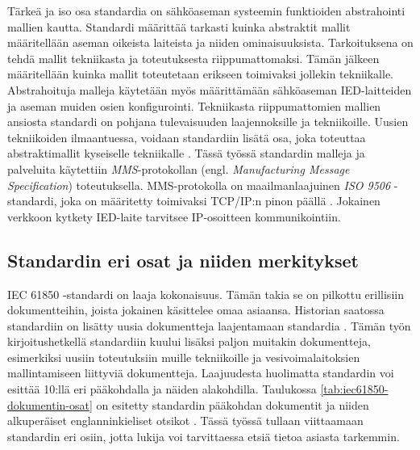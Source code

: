 Tärkeä ja iso osa standardia on sähköaseman systeemin funktioiden abstrahointi mallien kautta. Standardi määrittää tarkasti kuinka abstraktit mallit määritellään aseman oikeista laiteista ja niiden ominaisuuksista. Tarkoituksena on tehdä mallit tekniikasta ja toteutuksesta riippumattomaksi. Tämän jälkeen määritellään kuinka mallit toteutetaan erikseen toimivaksi jollekin tekniikalle. Abstrahoituja malleja käytetään myös määrittämään sähköaseman IED-laitteiden ja aseman muiden osien konfigurointi. Tekniikasta riippumattomien mallien ansiosta standardi on pohjana tulevaisuuden laajennoksille ja tekniikoille. Uusien tekniikoiden ilmaantuessa, voidaan standardiin lisätä  osa, joka  toteuttaa abstraktimallit kyseiselle tekniikalle \mbox{\cite[s.~2]{Brunner2008}}. Tässä työssä standardin malleja ja palveluita käytettiin \emph{MMS}-protokollan (engl. \emph{Manufacturing Message Specification}) toteutuksella. MMS-protokolla on maailmanlaajuinen \emph{ISO 9506} -standardi, joka on määritetty toimivaksi TCP/IP:n pinon päällä \mbox{\cite{MMS-protocol-stack-and-API}}. Jokainen verkkoon kytkety IED-laite tarvitsee IP-osoitteen kommunikointiin.


\subsection{Standardin eri osat ja niiden merkitykset}	
IEC 61850 -standardi on laaja kokonaisuus. Tämän takia se on pilkottu erillisiin dokumentteihin, joista jokainen käsittelee omaa asiaansa. Historian saatossa standardiin on lisätty uusia dokumentteja laajentamaan standardia \mbox{\cite{IEC61850series, New-documents-by-IEC-TC-57}} \mbox{\cite[s.~13]{IEC61850-1}}. Tämän työn kirjoitushetkellä standardiin kuului lisäksi paljon muitakin dokumentteja, esimerkiksi uusiin toteutuksiin muille tekniikoille ja vesivoimalaitoksien mallintamiseen liittyviä dokumentteja. Laajuudesta huolimatta standardin voi esittää 10:llä eri pääkohdalla ja näiden alakohdilla. Taulukossa \ref{tab:iec61850-dokumentin-osat} on esitetty standardin pääkohdan dokumentit ja niiden alkuperäiset englanninkieliset otsikot \mbox{\cite{IEC61850series}}. Tässä työssä tullaan viittaamaan standardin eri osiin, jotta lukija voi tarvittaessa etsiä tietoa asiasta tarkemmin.

